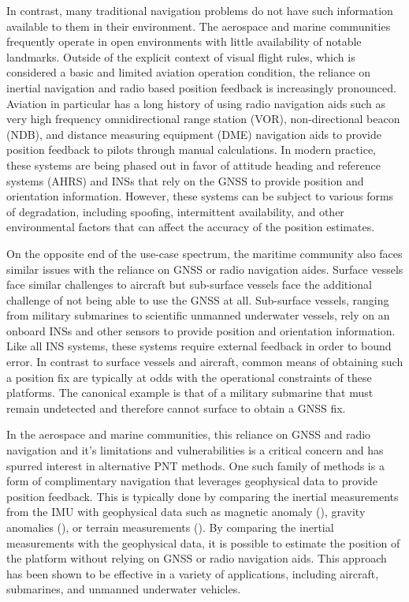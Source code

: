 \documentclass[sageh,times]{sagej}
\begin{document}
In contrast, many traditional navigation problems do not have such information available to them in their environment. The aerospace and marine communities frequently operate in open environments with little availability of notable landmarks. Outside of the explicit context of visual flight rules, which is considered a basic and limited aviation operation condition, the reliance on inertial navigation and radio based position feedback is increasingly pronounced. Aviation in particular has a long history of using radio navigation aids such as very high frequency omnidirectional range station (VOR), non-directional beacon (NDB), and distance measuring equipment (DME) navigation aids to provide position feedback to pilots through manual calculations. In modern practice, these systems are being phased out in favor of attitude heading and reference systems (AHRS) and INSs that rely on the GNSS to provide position and orientation information. However, these systems can be subject to various forms of degradation, including spoofing, intermittent availability, and other environmental factors that can affect the accuracy of the position estimates.

On the opposite end of the use-case spectrum, the maritime community also faces similar issues with the reliance on GNSS or radio navigation aides. Surface vessels face similar challenges to aircraft but sub-surface vessels face the additional challenge of not being able to use the GNSS at all. Sub-surface vessels, ranging from military submarines to scientific unmanned underwater vessels, rely on an onboard INSs and other sensors to provide position and orientation information. Like all INS systems, these systems require external feedback in order to bound error. In contrast to surface vessels and aircraft, common means of obtaining such a position fix are typically at odds with the operational constraints of these platforms. The canonical example is that of a military submarine that must remain undetected and therefore cannot surface to obtain a GNSS fix. 

In the aerospace and marine communities, this reliance on GNSS and radio navigation and it's limitations and vulnerabilities is a critical concern and has spurred interest in alternative PNT methods. One such family of methods is a form of complimentary navigation that leverages geophysical data to provide position feedback. This is typically done by comparing the inertial measurements from the IMU with geophysical data such as magnetic anomaly (\cite{magnav, tyren1982magnetic, canciani2016absolute,canciani2017airborne}), gravity anomalies (\cite{gravnav,jircitano1991gravity,kamgar1999vehicle,wang2016particle}), or terrain measurements (\cite{}). By comparing the inertial measurements with the geophysical data, it is possible to estimate the position of the platform without relying on GNSS or radio navigation aids. This approach has been shown to be effective in a variety of applications, including aircraft, submarines, and unmanned underwater vehicles.
\end{document}
